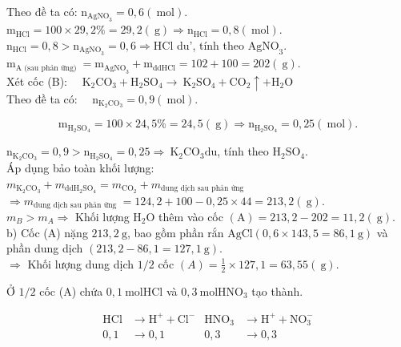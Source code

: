 \documentclass[10pt]{article}
\begin{document}
Theo đề ta có: $\mathrm{n}_{\mathrm{AgNO}_{3}}=0,6(\mathrm{~mol})$.\\
$\mathrm{m}_{\mathrm{HCl}}=100 \times 29,2 \%=29,2(\mathrm{~g}) \Rightarrow \mathrm{n}_{\mathrm{HCl}}=0,8(\mathrm{~mol})$.\\
$\mathrm{n}_{\mathrm{HCl}}=0,8>\mathrm{n}_{\mathrm{AgNO}_{3}}=0,6 \Rightarrow \mathrm{HCl}$ du', tính theo $\mathrm{AgNO}_{3}$.\\
$\mathrm{m}_{\mathrm{A} \text { (sau phản ứng) }}=\mathrm{m}_{\mathrm{AgNO}_{3}}+\mathrm{m}_{\mathrm{dd} \mathrm{HCl}}=102+100=202(\mathrm{~g})$.\\
Xét cốc (B): $\quad \mathrm{K}_{2} \mathrm{CO}_{3}+\mathrm{H}_{2} \mathrm{SO}_{4} \rightarrow \mathrm{~K}_{2} \mathrm{SO}_{4}+\mathrm{CO}_{2} \uparrow+\mathrm{H}_{2} \mathrm{O}$\\
Theo đề ta có: $\quad \mathrm{n}_{\mathrm{K}_{2} \mathrm{CO}_{3}}=0,9(\mathrm{~mol})$.

$$
\mathrm{m}_{\mathrm{H}_{2} \mathrm{SO}_{4}}=100 \times 24,5 \%=24,5(\mathrm{~g}) \Rightarrow \mathrm{n}_{\mathrm{H}_{2} \mathrm{SO}_{4}}=0,25(\mathrm{~mol}) .
$$

$\mathrm{n}_{\mathrm{K}_{2} \mathrm{CO}_{3}}=0,9>\mathrm{n}_{\mathrm{H}_{2} \mathrm{SO}_{4}}=0,25 \Rightarrow \mathrm{~K}_{2} \mathrm{CO}_{3} \mathrm{du}$, tính theo $\mathrm{H}_{2} \mathrm{SO}_{4}$.\\
Áp dụng bảo toàn khối lượng:\\
$m_{\mathrm{K}_{2} \mathrm{CO}_{3}}+m_{\mathrm{dd} \mathrm{H}_{2} \mathrm{SO}_{4}}=m_{\mathrm{CO}_{2}}+m_{\text {dung dịch sau phản ứng }}$\\
$\Rightarrow m_{\text {dung dịch sau phản ứng }}=124,2+100-0,25 \times 44=213,2(\mathrm{~g})$.\\
$m_{B}>m_{A} \Rightarrow$ Khối lượng $\mathrm{H}_{2} \mathrm{O}$ thêm vào cốc $(\mathrm{A})=213,2-202=11,2(\mathrm{~g})$.\\
b) Cốc (A) nặng $213,2 \mathrm{~g}$, bao gồm phần rắn $\mathrm{AgCl}(0,6 \times 143,5=86,1 \mathrm{~g})$ và phần dung dịch $(213,2-86,1=127,1 \mathrm{~g})$.\\
$\Rightarrow$ Khối lượng dung dịch $1 / 2$ cốc $(A)=\frac{1}{2} \times 127,1=63,55(\mathrm{~g})$.

Ở $1 / 2$ cốc (A) chứa $0,1 \mathrm{~mol} \mathrm{HCl}$ và $0,3 \mathrm{~mol} \mathrm{HNO}_{3}$ tạo thành.

$$
\begin{array}{rlrl}
\mathrm{HCl} & \rightarrow \mathrm{H}^{+}+\mathrm{Cl}^{-} & \mathrm{HNO}_{3} & \rightarrow \mathrm{H}^{+}+\mathrm{NO}_{3}^{-} \\
0,1 & \rightarrow 0,1 & 0,3 & \rightarrow 0,3
\end{array}
$$
\end{document}
